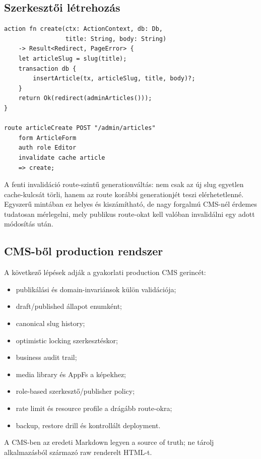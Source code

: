 \subsection*{Szerkesztői létrehozás}

\begin{lstlisting}[language=RWLang]
action fn create(ctx: ActionContext, db: Db,
                 title: String, body: String)
    -> Result<Redirect, PageError> {
    let articleSlug = slug(title);
    transaction db {
        insertArticle(tx, articleSlug, title, body)?;
    }
    return Ok(redirect(adminArticles()));
}

route articleCreate POST "/admin/articles"
    form ArticleForm
    auth role Editor
    invalidate cache article
    => create;
\end{lstlisting}

A fenti invalidáció route-szintű generationváltás: nem csak az új slug egyetlen cache-kulcsát törli, hanem az  route korábbi generationjét teszi elérhetetlenné. Egyszerű mintában ez helyes és kiszámítható, de nagy forgalmú CMS-nél érdemes tudatosan mérlegelni, mely publikus route-okat kell valóban invalidálni egy adott módosítás után.

\subsection*{CMS-ből production rendszer}

A következő lépések adják a gyakorlati production CMS gerincét:

\begin{itemize}
  \item publikálási és domain-invariánsok külön validációja;
  \item draft/published állapot enumként;
  \item canonical slug history;
  \item optimistic locking szerkesztéskor;
  \item business audit trail;
  \item media library és AppFs a képekhez;
  \item role-based szerkesztő/publisher policy;
  \item rate limit és resource profile a drágább route-okra;
  \item backup, restore drill és kontrollált deployment.
\end{itemize}

A CMS-ben az eredeti Markdown legyen a source of truth; ne tárolj alkalmazásból származó raw renderelt HTML-t.
